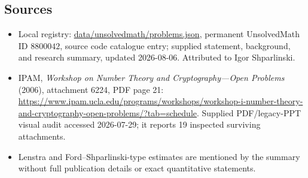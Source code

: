 \documentclass[11pt]{article}
\begin{document}
\subsection{Sources}
\begin{itemize}
\item Local registry: \url{data/unsolvedmath/problems.json}, permanent UnsolvedMath ID \(8800042\), source code catalogue entry; supplied statement, background, and research summary, updated 2026-08-06. Attributed to Igor Shparlinski.
\item IPAM, \emph{Workshop on Number Theory and Cryptography---Open Problems} (2006), attachment 6224, PDF page 21: \url{https://www.ipam.ucla.edu/programs/workshops/workshop-i-number-theory-and-cryptography-open-problems/?tab=schedule}. Supplied PDF/legacy-PPT visual audit accessed 2026-07-29; it reports 19 inspected surviving attachments.
\item Lenstra and Ford--Shparlinski-type estimates are mentioned by the summary without full publication details or exact quantitative statements.
\end{itemize}
\end{document}
